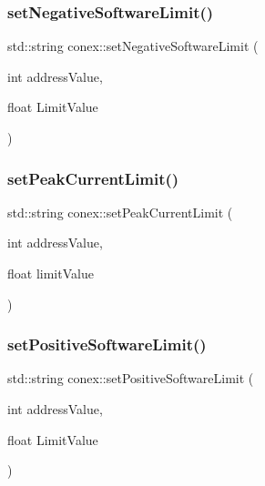 \mbox{\label{namespaceconex_a70c1cfd0edc011bcf941ed9c4a63efe2}} 
\subsubsection{\texorpdfstring{set\+Negative\+Software\+Limit()}{setNegativeSoftwareLimit()}}
{\footnotesize\ttfamily std\+::string conex\+::set\+Negative\+Software\+Limit (\begin{DoxyParamCaption}\item[{int}]{address\+Value,  }\item[{float}]{Limit\+Value }\end{DoxyParamCaption})}

\mbox{\label{namespaceconex_ad4e9c3f1429c4d356c4814c816b1ce42}} 
\subsubsection{\texorpdfstring{set\+Peak\+Current\+Limit()}{setPeakCurrentLimit()}}
{\footnotesize\ttfamily std\+::string conex\+::set\+Peak\+Current\+Limit (\begin{DoxyParamCaption}\item[{int}]{address\+Value,  }\item[{float}]{limit\+Value }\end{DoxyParamCaption})}

\mbox{\label{namespaceconex_a786f1251f31ef6a30a042ac4fdbfb815}} 
\subsubsection{\texorpdfstring{set\+Positive\+Software\+Limit()}{setPositiveSoftwareLimit()}}
{\footnotesize\ttfamily std\+::string conex\+::set\+Positive\+Software\+Limit (\begin{DoxyParamCaption}\item[{int}]{address\+Value,  }\item[{float}]{Limit\+Value }\end{DoxyParamCaption})}

